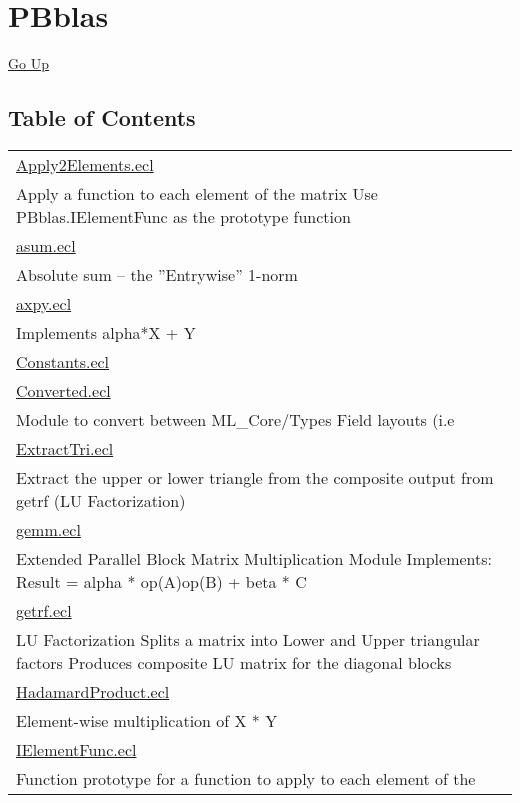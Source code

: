 \chapter*{\color{headtoc} PBblas}
\hypertarget{ecldoc:toc:root/PBblas}{}
\hyperlink{ecldoc:toc:root}{Go Up}


\section*{Table of Contents}
{\renewcommand{\arraystretch}{1.5}
\begin{longtable}{|p{\textwidth}|}
\hline
\hyperlink{ecldoc:toc:PBblas.Apply2Elements}{Apply2Elements.ecl} \\
Apply a function to each element of the matrix Use PBblas.IElementFunc as the prototype function \\
\hline
\hyperlink{ecldoc:toc:PBblas.asum}{asum.ecl} \\
Absolute sum -- the ''Entrywise'' 1-norm \\
\hline
\hyperlink{ecldoc:toc:PBblas.axpy}{axpy.ecl} \\
Implements alpha*X + Y \\
\hline
\hyperlink{ecldoc:toc:PBblas.Constants}{Constants.ecl} \\
\hline
\hyperlink{ecldoc:toc:PBblas.Converted}{Converted.ecl} \\
Module to convert between ML\_Core/Types Field layouts (i.e \\
\hline
\hyperlink{ecldoc:toc:PBblas.ExtractTri}{ExtractTri.ecl} \\
Extract the upper or lower triangle from the composite output from getrf (LU Factorization) \\
\hline
\hyperlink{ecldoc:toc:PBblas.gemm}{gemm.ecl} \\
Extended Parallel Block Matrix Multiplication Module Implements: Result = alpha * op(A)op(B) + beta * C \\
\hline
\hyperlink{ecldoc:toc:PBblas.getrf}{getrf.ecl} \\
LU Factorization Splits a matrix into Lower and Upper triangular factors Produces composite LU matrix for the diagonal blocks \\
\hline
\hyperlink{ecldoc:toc:PBblas.HadamardProduct}{HadamardProduct.ecl} \\
Element-wise multiplication of X * Y \\
\hline
\hyperlink{ecldoc:toc:PBblas.IElementFunc}{IElementFunc.ecl} \\
Function prototype for a function to apply to each element of the \\

\end{longtable}}
